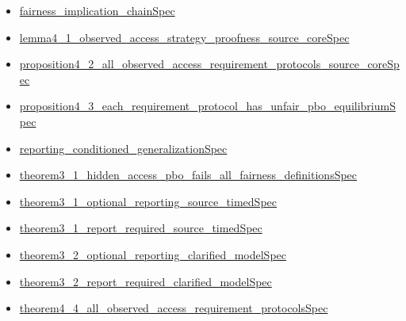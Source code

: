 \documentclass[10pt]{article}
\begin{document}
\begin{itemize}[leftmargin=1.2em]
\begin{itemize}[leftmargin=1.2em]
\item \hyperlink{source-claim-8b71c1403eedcaa5}{fairness\_\allowbreak{}implication\_\allowbreak{}chain\allowbreak{}Spec}
\item \hyperlink{source-claim-47d64178a8b01b72}{lemma4\_\allowbreak{}1\_\allowbreak{}observed\_\allowbreak{}access\_\allowbreak{}strategy\_\allowbreak{}proofness\_\allowbreak{}source\_\allowbreak{}core\allowbreak{}Spec}
\item \hyperlink{source-claim-967753ba3a07fa47}{proposition4\_\allowbreak{}2\_\allowbreak{}all\_\allowbreak{}observed\_\allowbreak{}access\_\allowbreak{}requirement\_\allowbreak{}protocols\_\allowbreak{}source\_\allowbreak{}core\allowbreak{}Spec}
\item \hyperlink{source-claim-180279c7d9836b3a}{proposition4\_\allowbreak{}3\_\allowbreak{}each\_\allowbreak{}requirement\_\allowbreak{}protocol\_\allowbreak{}has\_\allowbreak{}unfair\_\allowbreak{}pbo\_\allowbreak{}equilibrium\allowbreak{}Spec}
\item \hyperlink{source-claim-5ebd649546598182}{reporting\_\allowbreak{}conditioned\_\allowbreak{}generalization\allowbreak{}Spec}
\item \hyperlink{source-claim-c1ab3f67a9da6144}{theorem3\_\allowbreak{}1\_\allowbreak{}hidden\_\allowbreak{}access\_\allowbreak{}pbo\_\allowbreak{}fails\_\allowbreak{}all\_\allowbreak{}fairness\_\allowbreak{}definitions\allowbreak{}Spec}
\item \hyperlink{source-claim-6c73f99151b1b2c7}{theorem3\_\allowbreak{}1\_\allowbreak{}optional\_\allowbreak{}reporting\_\allowbreak{}source\_\allowbreak{}timed\allowbreak{}Spec}
\item \hyperlink{source-claim-017682a01e0507bb}{theorem3\_\allowbreak{}1\_\allowbreak{}report\_\allowbreak{}required\_\allowbreak{}source\_\allowbreak{}timed\allowbreak{}Spec}
\item \hyperlink{source-claim-1fc46568cc4fe01e}{theorem3\_\allowbreak{}2\_\allowbreak{}optional\_\allowbreak{}reporting\_\allowbreak{}clarified\_\allowbreak{}model\allowbreak{}Spec}
\item \hyperlink{source-claim-7d055230dc3ae301}{theorem3\_\allowbreak{}2\_\allowbreak{}report\_\allowbreak{}required\_\allowbreak{}clarified\_\allowbreak{}model\allowbreak{}Spec}
\item \hyperlink{source-claim-df450adcc2f093c2}{theorem4\_\allowbreak{}4\_\allowbreak{}all\_\allowbreak{}observed\_\allowbreak{}access\_\allowbreak{}requirement\_\allowbreak{}protocols\allowbreak{}Spec}

\end{itemize}
\end{itemize}
\end{document}
